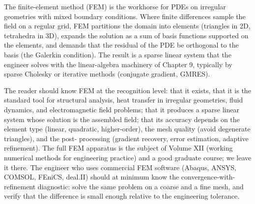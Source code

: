 The finite-element method (FEM) is the workhorse for PDEs on
irregular geometries with mixed boundary conditions. Where finite
differences sample the field on a regular grid, FEM partitions
the domain into elements (triangles in 2D, tetrahedra in 3D),
expands the solution as a sum of basis functions supported on the
elements, and demands that the residual of the PDE be orthogonal
to the basis (the Galerkin condition). The result is a sparse
linear system that the engineer solves with the linear-algebra
machinery of Chapter 9, typically by sparse Cholesky or iterative
methods (conjugate gradient, GMRES).

The reader should know FEM at the recognition level: that it
exists, that it is the standard tool for structural analysis,
heat transfer in irregular geometries, fluid dynamics, and
electromagnetic field problems; that it produces a sparse linear
system whose solution is the assembled field; that its accuracy
depends on the element type (linear, quadratic, higher-order),
the mesh quality (avoid degenerate triangles), and the post-
processing (gradient recovery, error estimation, adaptive
refinement). The full FEM apparatus is the subject of Volume XII
(working numerical methods for engineering practice) and a good
graduate course; we leave it there. The engineer who uses
commercial FEM software (Abaqus, ANSYS, COMSOL, FEniCS, deal.II)
should at minimum know the convergence-with-refinement diagnostic:
solve the same problem on a coarse and a fine mesh, and verify
that the difference is small enough relative to the engineering
tolerance.

